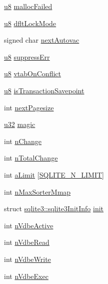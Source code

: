 \begin{DoxyCompactItemize}
\hyperlink{sqlite3_8c_a74a0f6424ae628af25f23f0a35f6ead3}{u8} \hyperlink{structsqlite3_a0d82e9510ad64166fce6b3c31cc73306}{malloc\+Failed}
\item 
\hyperlink{sqlite3_8c_a74a0f6424ae628af25f23f0a35f6ead3}{u8} \hyperlink{structsqlite3_ab6d4be4ea22755213051aa6fc53b75d2}{dflt\+Lock\+Mode}
\item 
signed char \hyperlink{structsqlite3_a94661adf68690fc28d4d81fc76375ca0}{next\+Autovac}
\item 
\hyperlink{sqlite3_8c_a74a0f6424ae628af25f23f0a35f6ead3}{u8} \hyperlink{structsqlite3_ab10e0c324afa5887a991a919343f82e4}{suppress\+Err}
\item 
\hyperlink{sqlite3_8c_a74a0f6424ae628af25f23f0a35f6ead3}{u8} \hyperlink{structsqlite3_ae9f4bb219530defeffc8df2b7f3d79a7}{vtab\+On\+Conflict}
\item 
\hyperlink{sqlite3_8c_a74a0f6424ae628af25f23f0a35f6ead3}{u8} \hyperlink{structsqlite3_a9de1db025ba0b992188929a11ae8f2d6}{is\+Transaction\+Savepoint}
\item 
int \hyperlink{structsqlite3_adb50d6f96dfed28c834af4ae15a2a32a}{next\+Pagesize}
\item 
\hyperlink{sqlite3_8c_a03ad5adfaeb9b7640dde78a0cc390319}{u32} \hyperlink{structsqlite3_a1c2f2992893a71ac0ee3f43477000176}{magic}
\item 
int \hyperlink{structsqlite3_a34a2d05071fd1eb026579e78343912a4}{n\+Change}
\item 
int \hyperlink{structsqlite3_a99c2d4293f61f6af708629bd69a41fdf}{n\+Total\+Change}
\item 
int \hyperlink{structsqlite3_acd0901741e378caf769163f3b3306c5f}{a\+Limit} \mbox{[}\hyperlink{sqlite3_8c_af59a055205f1a6cd6c4e302cfbde7c8c}{S\+Q\+L\+I\+T\+E\+\_\+\+N\+\_\+\+L\+I\+M\+I\+T}\mbox{]}
\item 
int \hyperlink{structsqlite3_ae21ed7e6503a77663f41c62115af6652}{n\+Max\+Sorter\+Mmap}
\item 
struct \hyperlink{structsqlite3_1_1sqlite3_init_info}{sqlite3\+::sqlite3\+Init\+Info} \hyperlink{structsqlite3_a1fe3b706937b668b0caecfb669600f38}{init}
\item 
int \hyperlink{structsqlite3_adc871aca341e4606d1e1f805cf6aa7c2}{n\+Vdbe\+Active}
\item 
int \hyperlink{structsqlite3_aec9833b30e0cc0116adeda7128c6824b}{n\+Vdbe\+Read}
\item 
int \hyperlink{structsqlite3_ac51e5e0b6558c0f8d5e7dc89abf728a6}{n\+Vdbe\+Write}
\item 
int \hyperlink{structsqlite3_aa35753c4135ed2357c1052a174f28aa0}{n\+Vdbe\+Exec}

\end{DoxyCompactItemize}
